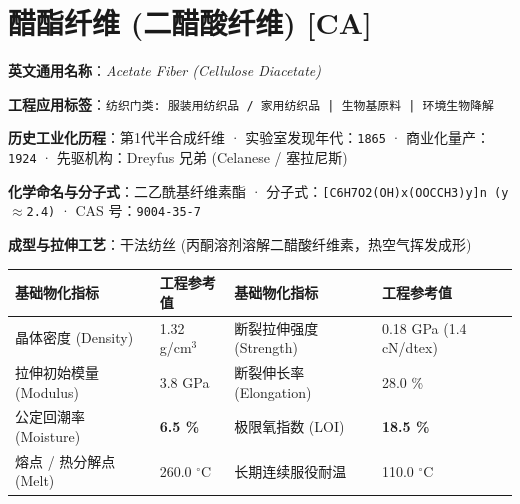 \documentclass[11pt,openright,twoside,UTF8]{ctexbook}
\begin{document}
\section{醋酯纤维 (二醋酸纤维) [CA]}
\label{sec:ca}

\noindent\textbf{英文通用名称}：\textit{Acetate Fiber (Cellulose Diacetate)}\par
\noindent\textbf{工程应用标签}：\texttt{纺织门类: 服装用纺织品 / 家用纺织品 | 生物基原料 | 环境生物降解}\par
\noindent\textbf{历史工业化历程}：第1代半合成纤维 · 实验室发现年代：\texttt{1865} · 商业化量产：\texttt{1924} · 先驱机构：Dreyfus 兄弟 (Celanese / 塞拉尼斯)\par
\noindent\textbf{化学命名与分子式}：二乙酰基纤维素酯 · 分子式：\texttt{[C6H7O2(OH)x(OOCCH3)y]n (y$\approx$2.4)} · CAS 号：\texttt{9004-35-7}\par
\noindent\textbf{成型与拉伸工艺}：干法纺丝 (丙酮溶剂溶解二醋酸纤维素，热空气挥发成形)\par

\vspace{0.15cm}
\begin{center}
\small
\begin{tabularx}{\textwidth}{p{3.8cm}Xp{3.8cm}X}
\toprule
\textbf{基础物化指标} & \textbf{工程参考值} & \textbf{基础物化指标} & \textbf{工程参考值} \\
\midrule
晶体密度 (Density) & 1.32 g/cm$^3$ & 断裂拉伸强度 (Strength) & 0.18 GPa (1.4 cN/dtex) \\
拉伸初始模量 (Modulus) & 3.8 GPa & 断裂伸长率 (Elongation) & 28.0 \% \\
公定回潮率 (Moisture) & \textbf{6.5 \%} & 极限氧指数 (LOI) & \textbf{18.5 \%} \\
熔点 / 热分解点 (Melt) & 260.0 $^\circ\mathrm{C}$ & 长期连续服役耐温 & 110.0 $^\circ\mathrm{C}$ \\
\bottomrule
\end{tabularx}
\end{center}
\vspace{0.15cm}
\end{document}
